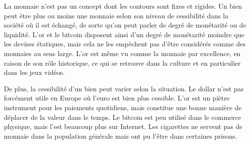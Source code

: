 La monnaie n'est pas un concept dont les contours sont fixes et rigides. Un bien peut être plus ou moins une monnaie selon son niveau de cessibilité dans la société où il est échangé, de sorte qu'on peut parler de degré de monétarité ou de liquidité. L'or et le bitcoin disposent ainsi d'un degré de monétarité moindre que les devises étatiques, mais cela ne les empêchent pas d'être considérés comme des monnaies au sens large. L'or est même vu comme la monnaie par excellence, en raison de son rôle historique, ce qui se retrouve dans la culture et en particulier dans les jeux vidéos. %

De plus, la cessibilité d'un bien peut varier selon la situation. Le dollar n'est pas forcément utile en Europe où l'euro est bien plus cessible. L'or est un piètre instrument pour les paiements quotidiens, mais constitue une bonne manière de déplacer de la valeur dans le temps. Le bitcoin est peu utilisé dans le commerce physique, mais l'est beaucoup plus sur Internet. Les cigarettes ne servent pas de monnaie dans la population générale mais ont pu l'être dans certaines prisons.

